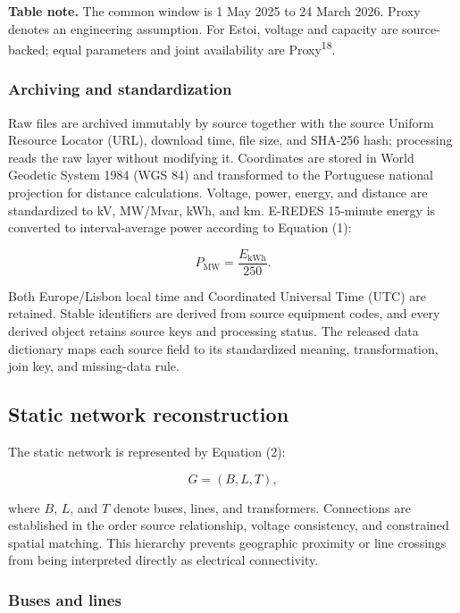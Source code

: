 \documentclass[
  10pt]{article}
\begin{document}
\textbf{Table note.} The common window is 1 May 2025 to 24 March 2026.
Proxy denotes an engineering assumption. For Estoi, voltage and capacity
are source-backed; equal parameters and joint availability are
Proxy\textsuperscript{18}.

\subsubsection{Archiving and
standardization}\label{archiving-and-standardization}

Raw files are archived immutably by source together with the source
Uniform Resource Locator (URL), download time, file size, and SHA-256
hash; processing reads the raw layer without modifying it. Coordinates
are stored in World Geodetic System 1984 (WGS 84) and transformed to the
Portuguese national projection for distance calculations. Voltage,
power, energy, and distance are standardized to kV, MW/Mvar, kWh, and
km. E-REDES 15-minute energy is converted to interval-average power
according to Equation (1):

\[
P_{\mathrm{MW}}=\frac{E_{\mathrm{kWh}}}{250}. \tag{1}\label{eq:energy-to-power}
\]

Both Europe/Lisbon local time and Coordinated Universal Time (UTC) are
retained. Stable identifiers are derived from source equipment codes,
and every derived object retains source keys and processing status. The
released data dictionary maps each source field to its standardized
meaning, transformation, join key, and missing-data rule.

\subsection{Static network
reconstruction}\label{static-network-reconstruction}

The static network is represented by Equation (2):

\[
G=(B,L,T), \tag{2}\label{eq:static-network}
\]

where \(B\), \(L\), and \(T\) denote buses, lines, and transformers.
Connections are established in the order source relationship, voltage
consistency, and constrained spatial matching. This hierarchy prevents
geographic proximity or line crossings from being interpreted directly
as electrical connectivity.

\subsubsection{Buses and lines}\label{buses-and-lines}
\end{document}
